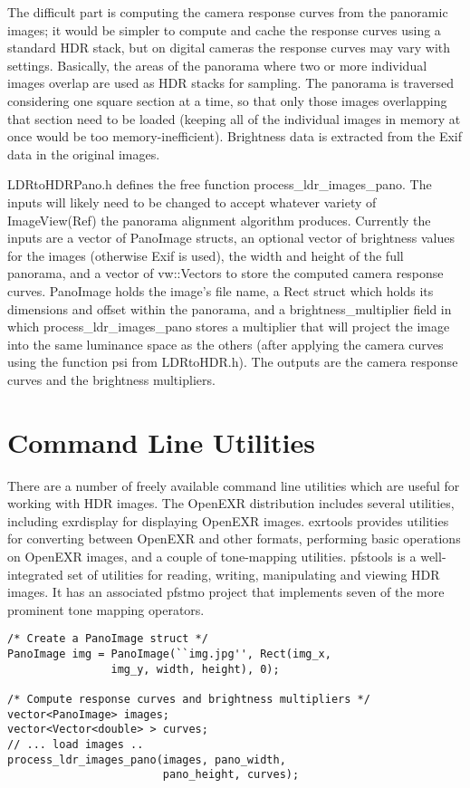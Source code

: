 The difficult part is computing the camera response curves from the
panoramic images; it would be simpler to compute and cache the
response curves using a standard HDR stack, but on digital cameras the
response curves may vary with settings. Basically, the areas of the
panorama where two or more individual images overlap are used as HDR
stacks for sampling. The panorama is traversed considering one square
section at a time, so that only those images overlapping that section
need to be loaded (keeping all of the individual images in memory at
once would be too memory-inefficient).  Brightness data is extracted
from the Exif data in the original images.

LDRtoHDRPano.h defines the free function
process\_ldr\_images\_pano. The inputs will likely need to be changed
to accept whatever variety of ImageView(Ref) the panorama alignment
algorithm produces. Currently the inputs are a vector of PanoImage
structs, an optional vector of brightness values for the images
(otherwise Exif is used), the width and height of the full panorama,
and a vector of vw::Vectors to store the computed camera response
curves. PanoImage holds the image's file name, a Rect struct which
holds its dimensions and offset within the panorama, and a
brightness\_multiplier field in which process\_ldr\_images\_pano
stores a multiplier that will project the image into the same
luminance space as the others (after applying the camera curves using
the function psi from LDRtoHDR.h). The outputs are the camera response
curves and the brightness multipliers.

\section{Command Line Utilities}
There are a number of freely available command line utilities which are useful for working
with HDR images. The OpenEXR distribution \cite{openexr} includes several utilities,
including exrdisplay for displaying OpenEXR images. exrtools \cite{exrtools} provides
utilities for converting between OpenEXR and other formats, performing basic operations
on OpenEXR images, and a couple of tone-mapping utilities. pfstools \cite{pfstools} is a
well-integrated set of utilities for reading, writing, manipulating and viewing HDR images.
It has an associated pfstmo project that implements seven of the more prominent tone
mapping operators.

\begin{verbatim}
/* Create a PanoImage struct */
PanoImage img = PanoImage(``img.jpg'', Rect(img_x,
                img_y, width, height), 0);

/* Compute response curves and brightness multipliers */
vector<PanoImage> images;
vector<Vector<double> > curves;
// ... load images ..
process_ldr_images_pano(images, pano_width,
                        pano_height, curves);
\end{verbatim}

